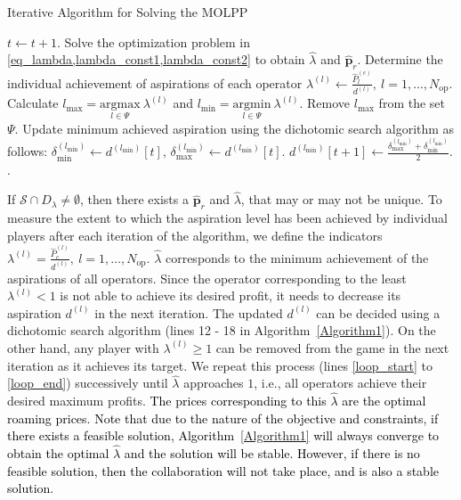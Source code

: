 \documentclass[10pt, letter, twocolumn]{IEEEtran}
\begin{document}
\begin{algorithm}[t!]
\small
\caption{Iterative Algorithm for Solving the MOLPP}
\label{Algorithm1}
\begin{algorithmic}[1]
\REPEAT \label{loop_start}
\STATE $t \gets t + 1$.
\STATE Solve the optimization problem in \cref{eq_lambda,lambda_const1,lambda_const2} to obtain $\hat{\lambda}$ and $\hat{\mathbf{p}}_{r}$.
\STATE Determine the individual achievement of aspirations of each operator $\lambda^{(l)} \gets \frac{\hat{P}_{l}^{(c)}}{d^{(l)}}, \ l=1,\ldots,N_{\text{op}}$.
\STATE Calculate $l_{\text{max}} = \underset{l \in \Psi}{\text{argmax}} \ \lambda^{(l)} $ and $l_{\text{min}} = \underset{l \in \Psi}{\text{argmin}} \ \lambda^{(l)}$.
\STATE Remove $l_{\text{max}}$ from the set $\Psi$.
\ENDIF
\IF {$\Psi \neq \emptyset$}
\STATE Update minimum achieved aspiration using the dichotomic search algorithm as follows:
\STATE $\delta_{\text{min}}^{(l_{\text{min}})} \gets d^{(l_{\text{min}})}[t]$,
\ELSE
\STATE $\delta_{\text{max}}^{(l_{\text{min}})} \gets d^{(l_{\text{min}})}[t]$.
\ENDIF
\STATE $d^{(l_{\text{min}})}[t+1] \gets \frac{\delta_{\text{max}}^{(l_{\text{min}})} + \delta_{\text{min}}^{(l_{\text{min}})} }{2}$.
\ENDIF
{}. \label{loop_end}
\end{algorithmic}
\end{algorithm}
\normalsize
If $\mathcal{S} \cap D_{\lambda} \neq \emptyset$, then there exists a $\hat{\mathbf{p}}_{r}$ and $\hat{\lambda}$, that may or may not be unique. To measure the extent to which the aspiration level has been achieved by individual players after each iteration of the algorithm, we define the indicators $\lambda^{(l)} = \frac{\hat{P}_{c}^{(l)}}{d^{(l)}}, \ l= 1,\ldots,N_{\text{op}}$. $\hat{\lambda}$ corresponds to the minimum achievement of the aspirations of all operators. Since the operator corresponding to the least $\lambda^{(l)} < 1$ is not able to achieve its desired profit, it needs to decrease its aspiration $d^{(l)}$ in the next iteration. The updated $d^{(l)}$ can be decided using a dichotomic search algorithm (lines 12 - 18 in Algorithm~\ref{Algorithm1}). On the other hand, any player with $\lambda^{(l)} \geq 1$ can be removed from the game in the next iteration as it achieves its target. We repeat this process (lines \ref{loop_start} to \ref{loop_end}) successively until $\hat{\lambda}$ approaches $1$, i.e., all operators achieve their desired maximum profits. \textcolor{black}{The prices corresponding to this $\hat{\lambda}$ are the optimal roaming prices. Note that due to the nature of the objective and constraints, if there exists a feasible solution, Algorithm~\ref{Algorithm1} will always converge to obtain the optimal $\hat{\lambda}$ and the solution will be stable. However, if there is no feasible solution, then the collaboration will not take place, and is also a stable solution.}
\end{document}
